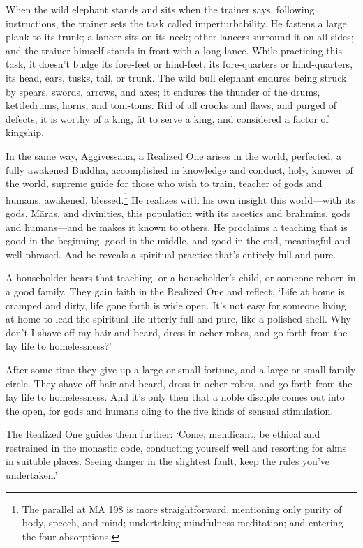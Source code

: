 \documentclass[12pt,openany]{book}%
\begin{document}
When the wild elephant stands and sits when the trainer says, following instructions, the trainer sets the task called imperturbability. He fastens a large plank to its trunk; a lancer sits on its neck; other lancers surround it on all sides; and the trainer himself stands in front with a long lance. While practicing this task, it doesn’t budge its fore-feet or hind-feet, its fore-quarters or hind-quarters, its head, ears, tusks, tail, or trunk. The wild bull elephant endures being struck by spears, swords, arrows, and axes; it endures the thunder of the drums, kettledrums, horns, and tom-toms. Rid of all crooks and flaws, and purged of defects, it is worthy of a king, fit to serve a king, and considered a factor of kingship. 

In the same way, Aggivessana, a Realized One arises in the world, perfected, a fully awakened Buddha, accomplished in knowledge and conduct, holy, knower of the world, supreme guide for those who wish to train, teacher of gods and humans, awakened, blessed.\footnote{The parallel at MA 198 is more straightforward, mentioning only purity of body, speech, and mind; undertaking mindfulness meditation; and entering the four absorptions. } He realizes with his own insight this world—with its gods, \textsanskrit{Māras}, and divinities, this population with its ascetics and brahmins, gods and humans—and he makes it known to others. He proclaims a teaching that is good in the beginning, good in the middle, and good in the end, meaningful and well-phrased. And he reveals a spiritual practice that’s entirely full and pure. 

A householder hears that teaching, or a householder’s child, or someone reborn in a good family. They gain faith in the Realized One and reflect, ‘Life at home is cramped and dirty, life gone forth is wide open. It’s not easy for someone living at home to lead the spiritual life utterly full and pure, like a polished shell. Why don’t I shave off my hair and beard, dress in ocher robes, and go forth from the lay life to homelessness?’ 

After some time they give up a large or small fortune, and a large or small family circle. They shave off hair and beard, dress in ocher robes, and go forth from the lay life to homelessness. And it’s only then that a noble disciple comes out into the open, for gods and humans cling to the five kinds of sensual stimulation. 

The Realized One guides them further: ‘Come, mendicant, be ethical and restrained in the monastic code, conducting yourself well and resorting for alms in suitable places. Seeing danger in the slightest fault, keep the rules you’ve undertaken.’ 
\end{document}
